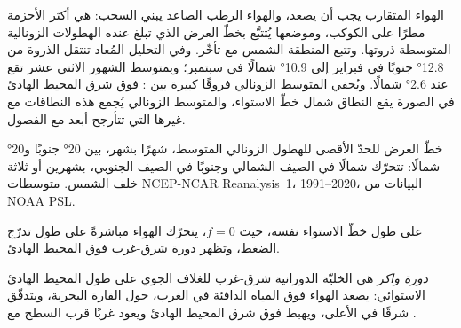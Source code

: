 الهواء المتقارب يجب أن يصعد، والهواء الرطب الصاعد يبني السحب:  هي أكثر الأحزمة مطرًا على الكوكب، وموضعها يُتتبَّع بخطّ العرض الذي تبلغ عنده الهطولات الزونالية المتوسطة ذروتها. وتتبع المنطقة الشمس مع تأخّر. وفي التحليل المُعاد تنتقل الذروة من \ang{12.8} جنوبًا في فبراير إلى \ang{10.9} شمالًا في سبتمبر؛ وبمتوسط الشهور الاثني عشر تقع عند \ang{2.6} شمالًا. ويُخفي المتوسط الزونالي فروقًا كبيرة بين : فوق شرق المحيط الهادئ في الصورة يقع النطاق شمال خطّ الاستواء، والمتوسط الزونالي يُجمع هذه النطاقات مع غيرها التي تتأرجح أبعد مع الفصول.

\begin{omfigure}

{\small خطّ العرض للحدّ الأقصى للهطول الزونالي المتوسط، شهرًا بشهر، بين \ang{20} جنوبًا و\ang{20} شمالًا: تتحرّك  شمالًا في الصيف الشمالي وجنوبًا في الصيف الجنوبي، بشهرين أو ثلاثة خلف الشمس.
متوسطات NCEP-NCAR Reanalysis~1، 1991--2020، البيانات من NOAA PSL.}
\label{fig:b1:atmospheric-circulation:itcz}
\end{omfigure}

على طول خطّ الاستواء نفسه، حيث $f = 0$، يتحرّك الهواء مباشرةً على طول تدرّج الضغط، وتظهر دورة شرق-غرب فوق المحيط الهادئ.

\begin{definition}\label{def:b1:atmospheric-circulation:walker}
\emph{دورة واكر} هي الخليّة الدورانية شرق-غرب للغلاف الجوي على طول المحيط الهادئ الاستوائي: يصعد الهواء فوق المياه الدافئة في الغرب، حول القارة البحرية، ويتدفّق شرقًا في الأعلى، ويهبط فوق شرق المحيط الهادئ ويعود غربًا قرب السطح مع .
\end{definition}

